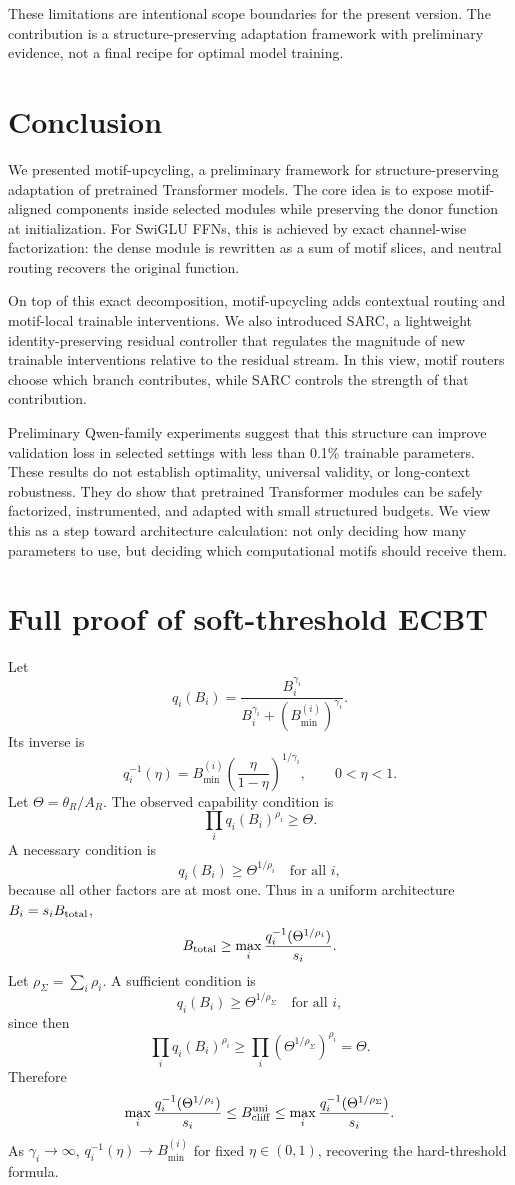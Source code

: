 \documentclass[11pt]{article}
\theoremstyle{definition}
\begin{document}
These limitations are intentional scope boundaries for the present version. The contribution is a structure-preserving adaptation framework with preliminary evidence, not a final recipe for optimal model training.

\section{Conclusion}

We presented motif-upcycling, a preliminary framework for structure-preserving adaptation of pretrained Transformer models. The core idea is to expose motif-aligned components inside selected modules while preserving the donor function at initialization. For SwiGLU FFNs, this is achieved by exact channel-wise factorization: the dense module is rewritten as a sum of motif slices, and neutral routing recovers the original function.

On top of this exact decomposition, motif-upcycling adds contextual routing and motif-local trainable interventions. We also introduced SARC, a lightweight identity-preserving residual controller that regulates the magnitude of new trainable interventions relative to the residual stream. In this view, motif routers choose which branch contributes, while SARC controls the strength of that contribution.

Preliminary Qwen-family experiments suggest that this structure can improve validation loss in selected settings with less than 0.1\% trainable parameters. These results do not establish optimality, universal validity, or long-context robustness. They do show that pretrained Transformer modules can be safely factorized, instrumented, and adapted with small structured budgets. We view this as a step toward architecture calculation: not only deciding how many parameters to use, but deciding which computational motifs should receive them.

\appendix


\section{Full proof of soft-threshold ECBT}

Let
\[
q_i(B_i)=\frac{B_i^{\gamma_i}}{B_i^{\gamma_i}+(B_{\min}^{(i)})^{\gamma_i}}.
\]
Its inverse is
\[
q_i^{-1}(\eta)=B_{\min}^{(i)}\left(\frac{\eta}{1-\eta}\right)^{1/\gamma_i},\qquad 0<\eta<1.
\]
Let \(\Theta=\theta_R/A_R\). The observed capability condition is
\[
\prod_iq_i(B_i)^{\rho_i}\ge \Theta.
\]
A necessary condition is
\[
q_i(B_i)\ge \Theta^{1/\rho_i}\quad\text{for all }i,
\]
because all other factors are at most one. Thus in a uniform architecture \(B_i=s_iB_{\rm total}\),
\[
B_{\rm total}\ge \max_i\frac{q_i^{-1}(\Theta^{1/\rho_i})}{s_i}.
\]
Let \(\rho_\Sigma=\sum_i\rho_i\). A sufficient condition is
\[
q_i(B_i)\ge \Theta^{1/\rho_\Sigma}\quad\text{for all }i,
\]
since then
\[
\prod_iq_i(B_i)^{\rho_i}\ge\prod_i\left(\Theta^{1/\rho_\Sigma}\right)^{\rho_i}=\Theta.
\]
Therefore
\[
\max_i\frac{q_i^{-1}(\Theta^{1/\rho_i})}{s_i}
\le B_{\rm cliff}^{\rm uni}
\le
\max_i\frac{q_i^{-1}(\Theta^{1/\rho_\Sigma})}{s_i}.
\]
As \(\gamma_i\to\infty\), \(q_i^{-1}(\eta)\to B_{\min}^{(i)}\) for fixed \(\eta\in(0,1)\), recovering the hard-threshold formula.
\end{document}
